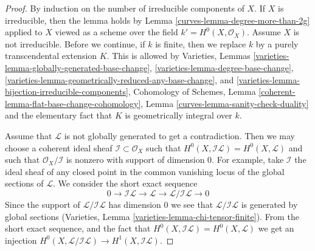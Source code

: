\begin{proof}

By induction on the number of irreducible components of $X$.
If $X$ is irreducible, then the lemma holds by
Lemma \ref{curves-lemma-degree-more-than-2g}
applied to $X$ viewed as a scheme over the field
$k' = H^0(X, \mathcal{O}_X)$. Assume $X$ is not irreducible.
Before we continue, if $k$ is finite, then we replace $k$
by a purely transcendental extension $K$. This is allowed by
Varieties, Lemmas
\ref{varieties-lemma-globally-generated-base-change},
\ref{varieties-lemma-degree-base-change},
\ref{varieties-lemma-geometrically-reduced-any-base-change}, and
\ref{varieties-lemma-bijection-irreducible-components},
Cohomology of Schemes, Lemma \ref{coherent-lemma-flat-base-change-cohomology},
Lemma \ref{curves-lemma-sanity-check-duality} and the elementary fact that
$K$ is geometrically integral over $k$.

\medskip\noindent
Assume that $\mathcal{L}$ is not globally generated to get a contradiction.
Then we may choose a coherent ideal sheaf
$\mathcal{I} \subset \mathcal{O}_X$ such that
$H^0(X, \mathcal{I}\mathcal{L}) = H^0(X, \mathcal{L})$
and such that $\mathcal{O}_X/\mathcal{I}$ is nonzero with
support of dimension $0$. For example, take $\mathcal{I}$
the ideal sheaf of any closed point in the common
vanishing locus of the global sections of $\mathcal{L}$.
We consider the short exact sequence
$$
0 \to \mathcal{I}\mathcal{L} \to \mathcal{L} \to
\mathcal{L}/\mathcal{I}\mathcal{L} \to 0
$$
Since the support of $\mathcal{L}/\mathcal{I}\mathcal{L}$
has dimension $0$ we see that $\mathcal{L}/\mathcal{I}\mathcal{L}$
is generated by global sections
(Varieties, Lemma \ref{varieties-lemma-chi-tensor-finite}).
From the short exact sequence,
and the fact that $H^0(X, \mathcal{I}\mathcal{L}) = H^0(X, \mathcal{L})$
we get an injection
$H^0(X, \mathcal{L}/\mathcal{I}\mathcal{L}) \to H^1(X, \mathcal{I}\mathcal{L})$.


\end{proof}
